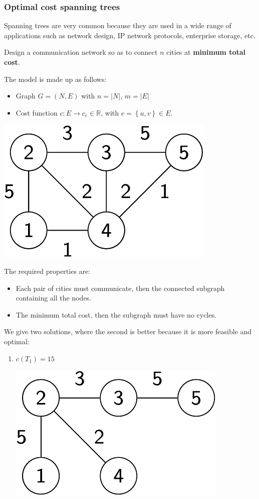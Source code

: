 \subsubsection{Optimal cost spanning trees}

Spanning trees are very common because they are used in a wide range of applications such as network design, IP network protocols, enterprise storage, etc.

\begin{examplebox}
    Design a communication network so as to connect $n$ cities at \textbf{minimum total cost}.

    The model is made up as follows:
    \begin{itemize}
        \item Graph $G = \left(N,E\right)$ with $n = \left| N \right|$, $m = \left| E \right|$
        \item Cost function $c: E \rightarrow c_{e} \in \mathbb{R}$, with $e = \left\{u,v\right\} \in E$.
    \end{itemize}
    \begin{center}
        \includegraphics[width=.3\textwidth]{img/trees-6.pdf}
    \end{center}

    The required properties are:
    \begin{itemize}
        \item Each pair of cities must communicate, then the connected subgraph containing all the nodes.
        \item The minimum total cost, then the subgraph must have no cycles.
    \end{itemize}

    We give two solutions, where the second is better because it is more feasible and optimal:
    \begin{enumerate}
        \item $c\left(T_{1}\right) = 15$
        \begin{center}
            \includegraphics[width=.3\textwidth]{img/trees-7.pdf}
        \end{center}


\end{enumerate}
\end{examplebox}
